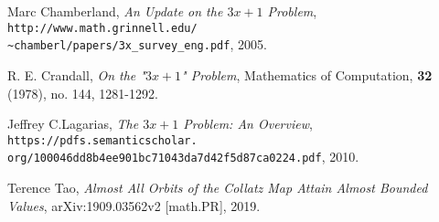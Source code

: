 \documentclass[12pt,a4paper,reqno]{amsart}
\begin{document}

\begin{thebibliography}{4}

 Marc Chamberland, 
    \textit{An Update on the $3x+1$ Problem},
    \texttt{http://www.math.grinnell.edu/\\
        \~{}chamberl/papers/3x\_survey\_eng.pdf}, 2005.

 R. E. Crandall, \textit{On the "$3x+1$" Problem},
    Mathematics of Computation, \textbf{32} (1978), no. 144, 1281-1292.

 Jeffrey C.Lagarias, 
    \textit{The $3x+1$ Problem: An Overview},
    \texttt{https://pdfs.semanticscholar.\\
        org/100046dd8b4ee901bc71043da7d42f5d87ca0224.pdf}, 2010.

 Terence Tao, \textit{Almost All Orbits of the Collatz Map Attain
    Almost Bounded Values}, arXiv:1909.03562v2 [math.PR], 2019.

\end{thebibliography}
\end{document}
